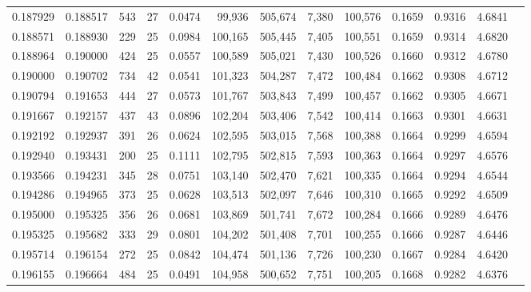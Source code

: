 \begin{tabular}{rrrrrrrrrrrrr}
0.187929 & 0.188517 &    543 &    27 &                                     0.0474 &  99,936 & 505,674 &   7,380 & 100,576 & 0.1659 & 0.9316 & 4.6841 \\
0.188571 & 0.188930 &    229 &    25 &                                     0.0984 & 100,165 & 505,445 &   7,405 & 100,551 & 0.1659 & 0.9314 & 4.6820 \\
0.188964 & 0.190000 &    424 &    25 &                                     0.0557 & 100,589 & 505,021 &   7,430 & 100,526 & 0.1660 & 0.9312 & 4.6780 \\
0.190000 & 0.190702 &    734 &    42 &                                     0.0541 & 101,323 & 504,287 &   7,472 & 100,484 & 0.1662 & 0.9308 & 4.6712 \\
0.190794 & 0.191653 &    444 &    27 &                                     0.0573 & 101,767 & 503,843 &   7,499 & 100,457 & 0.1662 & 0.9305 & 4.6671 \\
0.191667 & 0.192157 &    437 &    43 &                                     0.0896 & 102,204 & 503,406 &   7,542 & 100,414 & 0.1663 & 0.9301 & 4.6631 \\
0.192192 & 0.192937 &    391 &    26 &                                     0.0624 & 102,595 & 503,015 &   7,568 & 100,388 & 0.1664 & 0.9299 & 4.6594 \\
0.192940 & 0.193431 &    200 &    25 &                                     0.1111 & 102,795 & 502,815 &   7,593 & 100,363 & 0.1664 & 0.9297 & 4.6576 \\
0.193566 & 0.194231 &    345 &    28 &                                     0.0751 & 103,140 & 502,470 &   7,621 & 100,335 & 0.1664 & 0.9294 & 4.6544 \\
0.194286 & 0.194965 &    373 &    25 &                                     0.0628 & 103,513 & 502,097 &   7,646 & 100,310 & 0.1665 & 0.9292 & 4.6509 \\
0.195000 & 0.195325 &    356 &    26 &                                     0.0681 & 103,869 & 501,741 &   7,672 & 100,284 & 0.1666 & 0.9289 & 4.6476 \\
0.195325 & 0.195682 &    333 &    29 &                                     0.0801 & 104,202 & 501,408 &   7,701 & 100,255 & 0.1666 & 0.9287 & 4.6446 \\
0.195714 & 0.196154 &    272 &    25 &                                     0.0842 & 104,474 & 501,136 &   7,726 & 100,230 & 0.1667 & 0.9284 & 4.6420 \\
0.196155 & 0.196664 &    484 &    25 &                                     0.0491 & 104,958 & 500,652 &   7,751 & 100,205 & 0.1668 & 0.9282 & 4.6376 \\

\end{tabular}
